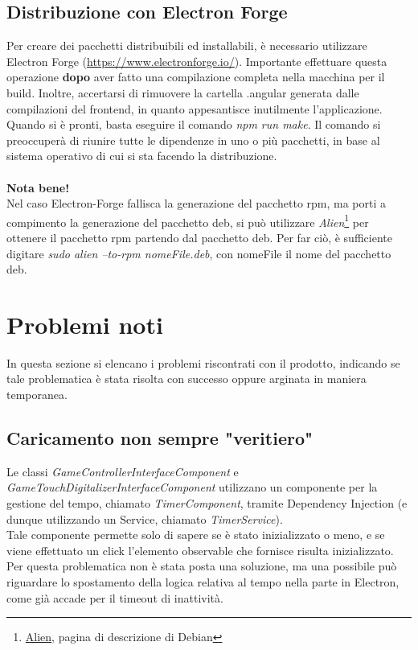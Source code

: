 \subsection{Distribuzione con Electron Forge}
Per creare dei pacchetti distribuibili ed installabili, è necessario utilizzare Electron Forge (\href{https://www.electronforge.io/}{https://www.electronforge.io/}). Importante effettuare questa operazione \textbf{dopo} aver fatto una compilazione completa nella macchina per il build. Inoltre, accertarsi di rimuovere la cartella .angular generata dalle compilazioni del frontend, in quanto appesantisce inutilmente l'applicazione.\\
Quando si è pronti, basta eseguire il comando \textit{npm run make}. Il comando si preoccuperà di riunire tutte le dipendenze in uno o più pacchetti, in base al sistema operativo di cui si sta facendo la distribuzione.\\\\
\textbf{Nota bene!}\\
Nel caso Electron-Forge fallisca la generazione del pacchetto rpm, ma porti a compimento la generazione del pacchetto deb, si può utilizzare \textit{Alien}\footnote[2]{\href{https://manpages.debian.org/unstable/alien/alien.1p.en.html}{Alien}, pagina di descrizione di Debian} per ottenere il pacchetto rpm partendo dal pacchetto deb. Per far ciò, è sufficiente digitare \textit{sudo alien --to-rpm nomeFile.deb}, con nomeFile il nome del pacchetto deb.
\newpage
\section{Problemi noti}
In questa sezione si elencano i problemi riscontrati con il prodotto, indicando se tale problematica è stata risolta con successo oppure arginata in maniera temporanea.
\subsection{Caricamento non sempre "veritiero"}
Le classi \textit{GameControllerInterfaceComponent} e \\ \textit{GameTouchDigitalizerInterfaceComponent} utilizzano un componente per la gestione del tempo, chiamato \textit{TimerComponent}, tramite Dependency Injection (e dunque utilizzando un Service, chiamato \textit{TimerService}).\\
Tale componente permette solo di sapere se è stato inizializzato o meno, e se viene effettuato un click l'elemento observable che fornisce risulta inizializzato.\\
Per questa problematica non è stata posta una soluzione, ma una possibile può riguardare lo spostamento della logica relativa al tempo nella parte in Electron, come già accade per il timeout di inattività.
